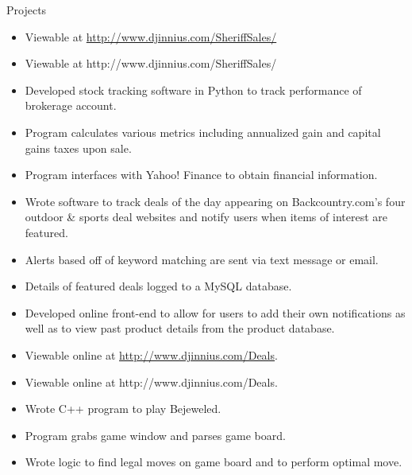 \begin{category}{Projects}
\begin{itemize}
\ifDjinniusLinks
\ifWebLinks
\item Viewable at \href{ http://www.djinnius.com/SheriffSales/ }{ http://www.djinnius.com/SheriffSales/}
\else
\item Viewable at  http://www.djinnius.com/SheriffSales/
\fi
\fi

\end{itemize}

\begin{itemize}
\item Developed stock tracking software in Python to track performance of brokerage account.
\item Program calculates various metrics including annualized gain and capital gains taxes upon sale.
\item Program interfaces with Yahoo! Finance to obtain financial information.
\end{itemize}



\begin{itemize}
\item Wrote software to track deals of the day appearing on Backcountry.com's four outdoor \& sports deal websites and notify users when items of interest are featured.
\item Alerts based off of keyword matching are sent via text message or email.
\item Details of featured deals logged to a MySQL database. 
\item Developed online front-end to allow for users to add their own notifications as well as to view past product details from the product database.
\ifDjinniusLinks
\ifWebLinks
\item Viewable online at \href{ http://www.djinnius.com/Deals/ }{http://www.djinnius.com/Deals}.
\else
\item Viewable online at http://www.djinnius.com/Deals.
\fi
\fi
\end{itemize}

\begin{itemize}
\item Wrote C++ program to play Bejeweled.
\item Program grabs game window and parses game board.
\item Wrote logic to find legal moves on game board and to perform optimal move.
\end{itemize}



\end{category}
